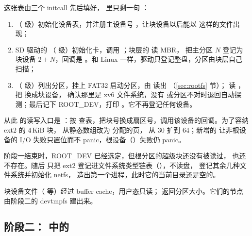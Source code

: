这张表由三个 initcall 先后填好， 里只剩一句 ：

\begin{enumerate}
  \item {}（ 级）初始化设备表，并注册主设备号 ，让块设备以后能以  这样的文件出现；
  \item SD 驱动的 （ 级）初始化卡，调用 ；块层的  读 MBR， 把主分区 $N$ 登记为块设备 $2+N$，回调是 。和 Linux 一样，驱动只登记整盘，分区由块层自己扫描；
  \item {}（ 级）列出分区，挂上 FAT32 启动分区，由  读出 （\ref{sec:rootfs} 节）； 读 ， 把  换成块设备， 确认那里是 xv6 文件系统，没有  或分区不对时退回自动探测；最后记下 ROOT\_DEV，打印 。它不再登记任何设备。
\end{enumerate}

从此  的读写入口是 ：按  查表，把块号换成扇区号，调用该设备的回调。为了容纳 ext2 的 4\,KiB 块， 从静态数组改为  分配的页， 从 30 扩到 64；新增的  让非根设备的 I/O 失败只置位而不 panic，根设备（）失败仍 panic。

阶段一结束时，ROOT\_DEV 已经选定，但根分区的超级块还没有被读过，\code{/} 也还不存在。随后  只把 ext2 登记进文件系统类型链表（），不读盘， 登记其余几种文件系统并初始化 netfs， 造出第一个进程，此时它的当前目录还是空的。

\begin{note}
  块设备文件（ 等）经过 buffer cache，用户态只读； 返回分区大小。它们的节点由阶段二的 devtmpfs 建出来。
\end{note}

\subsection{阶段二： 中的 }
\label{sec:ns-stage2}

